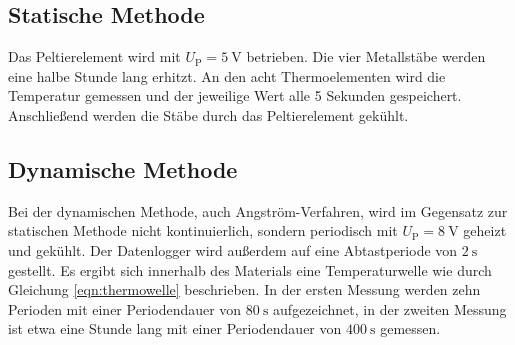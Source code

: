 \subsection{Statische Methode}
\label{sec:statische Methode}
Das Peltierelement wird mit $U_\text{P}=\SI{5}{\volt}$ betrieben.
Die vier Metallstäbe werden eine halbe Stunde lang erhitzt.
An den acht Thermoelementen wird die Temperatur gemessen und der jeweilige Wert alle 5 Sekunden gespeichert.
Anschließend werden die Stäbe durch das Peltierelement gekühlt.
%
\subsection{Dynamische Methode}
\label{sec:dynamische Methode}
Bei der dynamischen Methode, auch Angström-Verfahren, wird im Gegensatz zur statischen Methode nicht kontinuierlich,
sondern periodisch mit $U_\text{P}=\SI{8}{\volt}$ geheizt und gekühlt.
Der Datenlogger wird außerdem auf eine Abtastperiode von $\SI{2}{\second}$ gestellt.
Es ergibt sich innerhalb des Materials eine Temperaturwelle wie durch Gleichung \eqref{eqn:thermowelle} beschrieben.
In der ersten Messung werden zehn Perioden mit einer Periodendauer von $\SI{80}{\second}$ aufgezeichnet,
in der zweiten Messung ist etwa eine Stunde lang mit einer Periodendauer von $\SI{400}{\second}$ gemessen.
